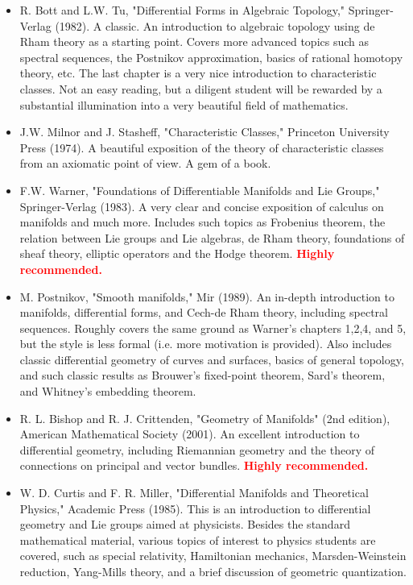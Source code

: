 \documentclass[10pt,a4paper]{book}
\theoremstyle{definition}
\begin{document}
\begin{itemize}
\item    R. Bott and L.W. Tu, "Differential Forms in Algebraic Topology," Springer-Verlag (1982). A classic. An introduction to algebraic topology using de Rham theory as a starting point. Covers more advanced topics such as spectral sequences, the Postnikov approximation, basics of rational homotopy theory, etc. The last chapter is a very nice introduction to characteristic classes. Not an easy reading, but a diligent student will be rewarded by a substantial illumination into a very beautiful field of mathematics.
\item    J.W. Milnor and J. Stasheff, "Characteristic Classes," Princeton University Press (1974). A beautiful exposition of the theory of characteristic classes from an axiomatic point of view. A gem of a book.
\item    F.W. Warner, "Foundations of Differentiable Manifolds and Lie Groups,"  Springer-Verlag (1983). A very clear and concise exposition of calculus on manifolds and much more.  Includes such topics as Frobenius theorem, the relation between Lie groups and Lie algebras, de Rham theory, foundations of sheaf theory, elliptic operators and the Hodge theorem. \textcolor{red}{\bf Highly recommended.}
 \item   M. Postnikov, "Smooth manifolds," Mir (1989). An in-depth introduction to manifolds, differential forms, and Cech-de Rham theory, including spectral sequences. Roughly covers the same ground as Warner's chapters 1,2,4, and 5, but the style is less formal (i.e. more motivation is provided). Also includes classic differential geometry of curves and surfaces, basics of general topology, and such classic results as Brouwer's fixed-point theorem, Sard's theorem, and Whitney's embedding theorem.
\item    R. L. Bishop and R. J. Crittenden, "Geometry of Manifolds" (2nd edition), American Mathematical Society (2001). An excellent introduction to differential geometry, including Riemannian geometry and the theory of connections on principal and vector bundles. \textcolor{red}{\bf  Highly recommended.}
\item    W. D. Curtis and F. R. Miller, "Differential Manifolds and Theoretical Physics,"  Academic Press (1985). This is an introduction to differential geometry and Lie groups aimed at physicists. Besides the standard mathematical material, various topics of interest to physics students are covered, such as special relativity, Hamiltonian mechanics, Marsden-Weinstein reduction, Yang-Mills theory, and a brief discussion of geometric quantization.

\end{itemize}
\end{document}
